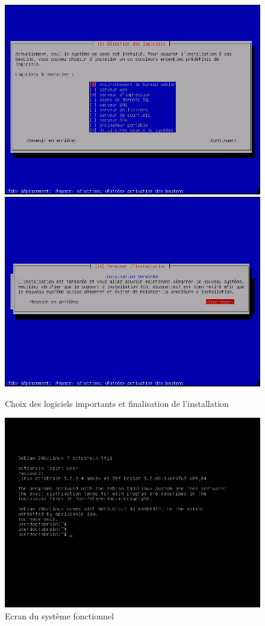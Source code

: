\begin{figure}
 \includegraphics[scale=0.35]{img/install/Deb_inst_15.png}
 \includegraphics[scale=0.35]{img/install/Deb_inst_16.png}
 \caption{Choix des logiciels importants et finalisation de l'installation}
\end{figure}
\begin{figure}[h]
\centering
 \includegraphics[scale=0.5]{img/install/Deb_inst_17.png}
 \caption{Ecran du système fonctionnel}
\end{figure}

